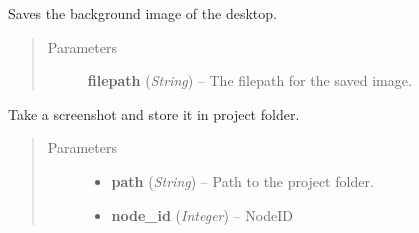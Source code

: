 \documentclass[letterpaper,10pt,english]{sphinxmanual}
\begin{document}

\begin{fulllineitems}
\label{filesystem:filesystem.save_screen}
Saves the background image of the desktop.
\begin{quote}\begin{description}
\item[{Parameters}] \leavevmode
\textbf{filepath} (\emph{String}) -- The filepath for the saved image.

\end{description}\end{quote}

\end{fulllineitems}


\begin{fulllineitems}
\label{filesystem:filesystem.screen_capture}
Take a screenshot and store it in project folder.
\begin{quote}\begin{description}
\item[{Parameters}] \leavevmode\begin{itemize}
\item {} 
\textbf{path} (\emph{String}) -- Path to the project folder.

\item {} 
\textbf{node\_id} (\emph{Integer}) -- NodeID

\end{itemize}

\end{description}\end{quote}

\end{fulllineitems}

\end{document}
